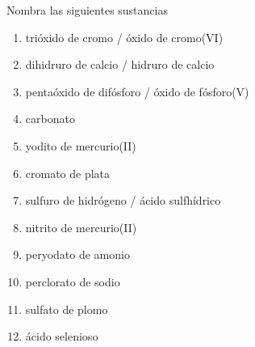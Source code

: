 \documentclass[10pt,a5paper,twoside]{article}
\begin{document}
\begin{exercise}[
    tags    = {inorgánica,nomenclatura,múltiple,2B},
    topics  = {química inorgánica,formulación,nomenclatura},
    source  = {Química 2B SAN 2016, p372, e10},
  ]
  Nombra las siguientes sustancias

  \begin{enumerate}\begin{multicols}{2}
    \item {}
    \item {}
    \item {}
    \item {}
    \item {}
    \item {}
    \item {}
    \item {}
    \item {}
    \item {}
    \item {}
    \item {}
  \end{multicols}\end{enumerate}
\end{exercise}

\begin{solution}
  \begin{enumerate}
    \item trióxido de cromo / óxido de cromo(VI)
    \item dihidruro de calcio / hidruro de calcio
    \item pentaóxido de difósforo / óxido de fósforo(V)
    \item carbonato
    \item yodito de mercurio(II)
    \item cromato de plata
    \item sulfuro de hidrógeno / ácido sulfhídrico
    \item nitrito de mercurio(II)
    \item peryodato de amonio
    \item perclorato de sodio
    \item sulfato de plomo
    \item ácido selenioso
  \end{enumerate}
\end{solution}
\end{document}
